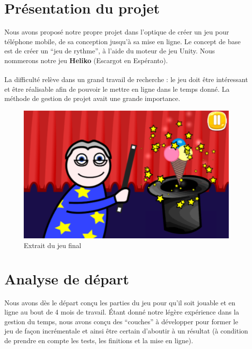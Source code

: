\section{Présentation du projet}

\paragraph{}
Nous avons proposé notre propre projet dans l’optique de créer un jeu pour téléphone mobile, de sa conception jusqu’à sa mise en ligne. Le concept de base est de créer un “jeu de rythme”, à l'aide du moteur de jeu Unity. Nous nommerons notre jeu \textbf{Heliko} (Escargot en Espéranto).

\paragraph{}
La difficulté relève dans un grand travail de recherche : le jeu doit être intéressant et être réalisable afin de pouvoir le mettre en ligne dans le temps donné. La méthode de gestion de projet avait une grande importance.

\begin{figure}[H]\centering
  \includegraphics[scale=1]{./img/game.png}
  \caption{Extrait du jeu final}
  \label{game}
\end{figure}

\section{Analyse de départ}

\paragraph{}
Nous avons dès le départ conçu les parties du jeu pour qu’il soit jouable et en ligne au bout de 4 mois de travail. Étant donné notre légère expérience dans la gestion du temps, nous avons conçu des “couches” à développer pour former le jeu de façon incrémentale et ainsi être certain d’aboutir à un résultat (à condition de prendre en compte les tests, les finitions et la mise en ligne).

